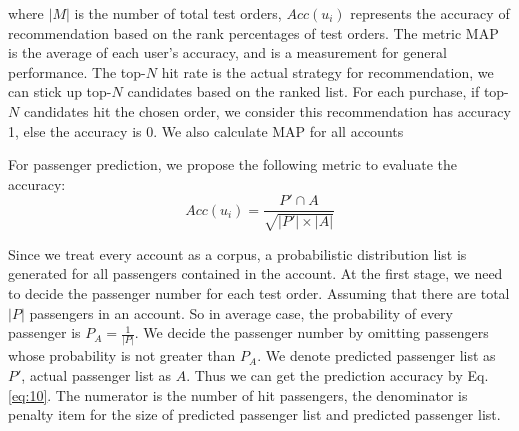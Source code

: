 \documentclass{llncs}
\begin{document}
where $|M|$ is the number of total test orders, $Acc(u_i)$ represents the accuracy of recommendation based on the rank percentages of test orders. The metric MAP is the average of each user's accuracy, and is a measurement for general performance. The top-$N$ hit rate is the actual strategy for recommendation, we can stick up top-$N$ candidates based on the ranked list. For each purchase, if top-$N$ candidates hit the chosen order, we consider this recommendation has accuracy 1, else the accuracy is 0. We also calculate MAP for all accounts \par
For passenger prediction, we propose the following metric to evaluate the accuracy:\\
\begin{equation}
\label{eq:10}
Acc(u_i) = \frac{P' \cap A}{\sqrt{|P'| \times |A|}}
\end{equation}\par
Since we treat every account as a corpus, a probabilistic distribution list is generated for all passengers contained in the account. At the first stage, we need to decide the passenger number for each test order. Assuming that there are total $|P|$ passengers in an account. So in average case, the probability of every passenger is $P_A = \frac{1}{|P|}$. We decide the passenger number by omitting passengers whose probability is not greater than $P_A$. We denote predicted passenger list as $P'$, actual passenger list as $A$. Thus we can get the prediction accuracy by Eq.\ref{eq:10}. The numerator is the number of hit passengers, the denominator is penalty item for the size of predicted passenger list and predicted passenger list.
\end{document}
